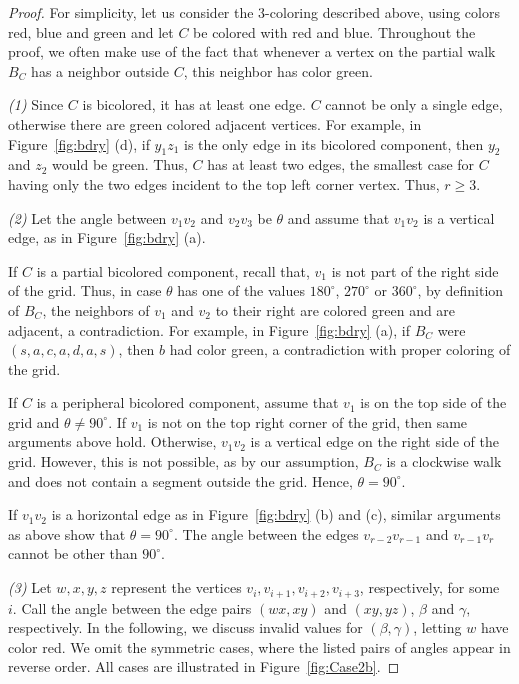 \documentclass[
final, nomarks
]{dmtcs-episciences}
\begin{document}
\begin{proof}  
For simplicity, let us consider the 3-coloring described above, using colors red, blue and green and let $C$ be colored with red and blue.
Throughout the proof, we often make use of the fact that 
whenever a vertex on  the partial walk $B_C$ has a neighbor outside $C$, 
this neighbor has color green. 

\noindent
{\it (1)}  Since $C$ is bicolored, it has at least one edge. 
$C$ cannot be only a single edge, otherwise there are green colored adjacent vertices. 
For example, in Figure~\ref{fig:bdry} (d), if $y_1z_1$ is the only edge in its bicolored component, then $y_2$ and $z_2$ would be green. 
Thus, $C$ has at least two edges, the smallest case for $C$ having only the two edges incident to the top left corner vertex. Thus, $r\geq 3.$ 

\noindent
{\it (2)} Let the angle between $v_1v_2$ and $v_2v_3$ be $\theta$ and assume that $v_1v_2$ is a vertical edge, as in Figure~\ref{fig:bdry} (a). 

If $C$ is a partial bicolored component, recall that, $v_1$ is not part of the right side of the grid. Thus, in case $\theta$ has one of the values $180^{\circ}$,  $270^{\circ}$ or $360^{\circ}$, by definition of $B_C$, the neighbors of $v_1$ and $v_2$ to their right  are colored green and are adjacent, a contradiction. For example, in Figure~\ref{fig:bdry} (a), if $B_C$ were $(s,a,c,a,d,a,s)$, then $b$ had color green, a contradiction with proper coloring of the grid. 

If $C$ is a peripheral bicolored component, assume that $v_1$ is on the top side of the grid and $\theta\neq 90^{\circ}$. If $v_1$ is not on the top right corner of the grid, then same arguments above hold. Otherwise, $v_1v_2$ is a vertical edge on the right side of the grid. However, this is not possible, as by our assumption, $B_C$ is a clockwise walk and does not contain a segment outside the grid. 
Hence, $\theta=90^{\circ}.$
 

If  $v_1v_2$ is a horizontal edge as in Figure~\ref{fig:bdry} (b) and (c), similar arguments as above show that $\theta=90^{\circ}.$ 
The angle between the edges $v_{r-2}v_{r-1}$ and $v_{r-1}v_r$ cannot be other than $90^{\circ}$. 

\noindent
{\it (3)} Let $w, x, y, z$ represent the vertices $v_i, v_{i+1}, v_{i+2}, v_{i+3}$, respectively, for some $i.$ 
Call the angle between the edge pairs  $(wx, xy)$ and $(xy, yz)$, $\beta$ and $\gamma,$ respectively. In the following, we discuss invalid values for $(\beta, \gamma)$, letting $w$ have color red. We omit the symmetric cases, where the listed pairs of angles appear in reverse order. All cases are illustrated in Figure~\ref{fig:Case2b}. 


\end{proof}
\end{document}

